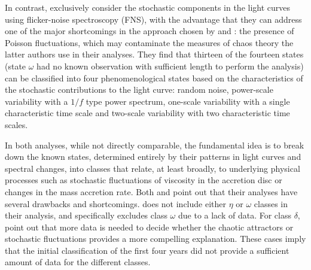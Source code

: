 \documentclass[12pt]{emulateapj}
\begin{document}
In contrast, \citet{polyakov2012} exclusively consider the stochastic components in the light curves using 
flicker-noise spectroscopy (FNS), with the advantage that they can address one of the major shortcomings in the approach chosen by \citet{misra2004,misra2006} and 
\citet{harikrishnan2011}: the presence of Poisson fluctuations, which may contaminate the measures of chaos theory the latter authors use in their analyses.
They find that thirteen of the fourteen states (state $\omega$ had no known observation with sufficient length to perform the analysis) can be classified into 
four phenomenological states based on the characteristics of the stochastic contributions to the light curve: random noise, power-scale variability with a $1/f$ type 
power spectrum, one-scale variability with a single characteristic time scale and two-scale variability with two characteristic time scales. 

In both analyses, while not directly comparable, the fundamental idea is to break down the known states, determined entirely by their patterns in light curves and 
spectral changes, into classes that relate, at least broadly, to underlying physical processes such as stochastic fluctuations of viscosity in the accretion disc or 
changes in the mass accretion rate. Both \citet{harikrishnan2011} and \citet{polyakov2012} point out that their analyses have several drawbacks and shortcomings. 
\citet{harikrishnan2011} does not include either $\eta$ or $\omega$ classes in their analysis, and \citet{polyakov2012} specifically excludes class $\omega$ due to 
a lack of data. For class $\delta$, \citet{polyakov2012} point out that more data is needed to decide whether the chaotic attractors or stochastic fluctuations 
provides a more compelling explanation. These cases imply that the initial classification of the first four years did not provide a sufficient amount of data for the 
different classes.
\end{document}

